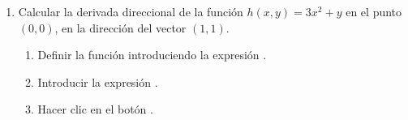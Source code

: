 \begin{enumerate}[leftmargin=*]

\item Calcular la derivada direccional de la función $h(x,y)= 3x^2+y$ en el punto $(0,0)$, en la dirección del vector
$(1,1)$.
\begin{indication}
\begin{enumerate}
\item Definir la función introduciendo la expresión .
\item Introducir la expresión .
\item Hacer clic en el botón .
\end{enumerate}
\end{indication}


\end{enumerate}
